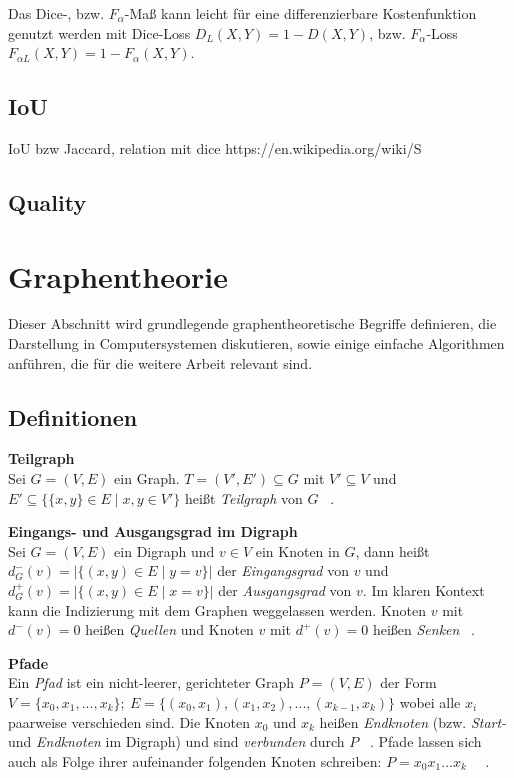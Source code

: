 Das Dice-, bzw. $F_{\alpha}$-Maß kann leicht für eine differenzierbare Kostenfunktion genutzt werden mit Dice-Loss $D_{L}(X, Y) = 1 - D(X,Y)$, bzw. $F_{\alpha}$-Loss $F_{\alpha L}(X,Y) = 1 - F_{\alpha}(X,Y)$. 


\subsection{\ac{IoU}}
IoU bzw Jaccard, relation mit dice https://en.wikipedia.org/wiki/S%


\subsection{Quality}


\section{Graphentheorie}

Dieser Abschnitt wird grundlegende graphentheoretische Begriffe definieren, die Darstellung in Computersystemen diskutieren, sowie einige einfache Algorithmen anführen, die für die weitere Arbeit relevant sind.

\subsection{Definitionen}


\textbf{Teilgraph} \\
Sei $G = (V, E)$ ein Graph. $T = (V', E') \subseteq G$ mit $V' \subseteq V$ und $E' \subseteq \{\{x,y\} \in E \mid x, y \in V'\}$ heißt \textit{Teilgraph} von $G$ ~\cite[S.~4]{Diestel.2016}.  


\textbf{Eingangs- und Ausgangsgrad im Digraph} \\
Sei $G = (V, E)$ ein Digraph und $v \in V$ ein Knoten in $G$, dann heißt $d^-_G(v) = | \{(x, y) \in E \mid y = v\} |$ der \textit{Eingangsgrad} von $v$ und $d^+_G(v) = | \{(x, y) \in E \mid x = v\} |$ der \textit{Ausgangsgrad} von $v$. Im klaren Kontext kann die Indizierung mit dem Graphen weggelassen werden. Knoten $v$ mit $d^-(v) = 0$ heißen  \textit{Quellen} und Knoten $v$ mit $d^+(v) = 0$ heißen  \textit{Senken} ~\cite[S.~460]{Satyanarayana.2014}.

\textbf{Pfade} \\ 
Ein \textit{Pfad} ist ein nicht-leerer, gerichteter Graph $P = (V, E)$ der Form $V = \{x_0, x_1, ..., x_k\};~E=\{(x_0,x_1), (x_1, x_2), ..., (x_{k-1}, x_k)\}$ wobei alle $x_i$ paarweise verschieden sind. Die Knoten $x_0$ und $x_k$ heißen \textit{Endknoten} (bzw. \textit{Start-} und \textit{Endknoten} im Digraph) und sind \textit{verbunden} durch $P$ ~\cite[S.~6]{Diestel.2016}. Pfade lassen sich auch als Folge ihrer aufeinander folgenden Knoten schreiben: $P = x_0x_1...x_k$ ~\cite[S.~7]{Diestel.2016}~\cite[S.~475]{Sedgewick.1992}. 


